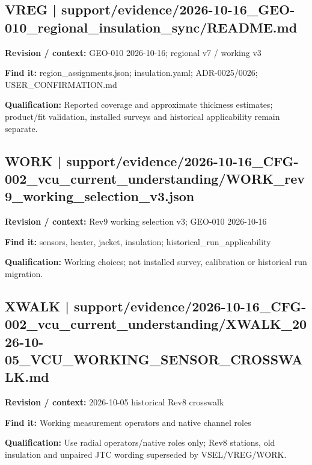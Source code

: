 \documentclass[11pt]{article}
\begin{document}
\par\noindent\begin{minipage}{\textwidth}\small
\subsection*{VREG | support/evidence/2026-10-16\_\allowbreak{}GEO-010\_\allowbreak{}regional\_\allowbreak{}insulation\_\allowbreak{}sync/README.md}
\textbf{Revision / context:} GEO-010 2026-10-16; regional v7 / working v3\par
\textbf{Find it:} region\_\allowbreak{}assignments.json; insulation.yaml; ADR-0025/0026; USER\_\allowbreak{}CONFIRMATION.md\par
\textbf{Qualification:} Reported coverage and approximate thickness estimates; product/fit validation, installed surveys and historical applicability remain separate.\par
\end{minipage}\par\vspace{5pt}
\par\noindent\begin{minipage}{\textwidth}\small
\subsection*{WORK | support/evidence/2026-10-16\_\allowbreak{}CFG-002\_\allowbreak{}vcu\_\allowbreak{}current\_\allowbreak{}understanding/WORK\_\allowbreak{}rev9\_\allowbreak{}working\_\allowbreak{}selection\_\allowbreak{}v3.json}
\textbf{Revision / context:} Rev9 working selection v3; GEO-010 2026-10-16\par
\textbf{Find it:} sensors, heater, jacket, insulation; historical\_\allowbreak{}run\_\allowbreak{}applicability\par
\textbf{Qualification:} Working choices; not installed survey, calibration or historical run migration.\par
\end{minipage}\par\vspace{5pt}
\par
\par\noindent\begin{minipage}{\textwidth}\small
\subsection*{XWALK | support/evidence/2026-10-16\_\allowbreak{}CFG-002\_\allowbreak{}vcu\_\allowbreak{}current\_\allowbreak{}understanding/XWALK\_\allowbreak{}2026-10-05\_\allowbreak{}VCU\_\allowbreak{}WORKING\_\allowbreak{}SENSOR\_\allowbreak{}CROSSWALK.md}
\textbf{Revision / context:} 2026-10-05 historical Rev8 crosswalk\par
\textbf{Find it:} Working measurement operators and native channel roles\par
\textbf{Qualification:} Use radial operators/native roles only; Rev8 stations, old insulation and unpaired JTC wording superseded by VSEL/VREG/WORK.\par
\end{minipage}\par\vspace{5pt}
\end{document}

